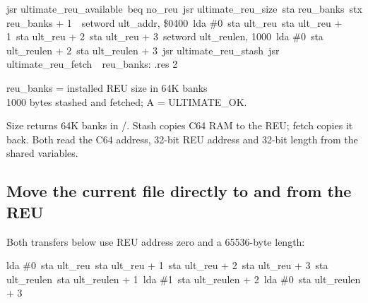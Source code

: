 \begin{listingbox}
\hspace*{2em}jsr ultimate\_reu\_available\
\hspace*{2em}beq no\_reu\
\hspace*{2em}jsr ultimate\_reu\_size\
\hspace*{2em}sta reu\_banks\
\hspace*{2em}stx reu\_banks + 1\
\
\hspace*{2em}setword ult\_addr, \$0400\
\hspace*{2em}lda \#0\
\hspace*{2em}sta ult\_reu\
\hspace*{2em}sta ult\_reu + 1\
\hspace*{2em}sta ult\_reu + 2\
\hspace*{2em}sta ult\_reu + 3\
\hspace*{2em}setword ult\_reulen, 1000\
\hspace*{2em}lda \#0\
\hspace*{2em}sta ult\_reulen + 2\
\hspace*{2em}sta ult\_reulen + 3\
\hspace*{2em}jsr ultimate\_reu\_stash\
\hspace*{2em}jsr ultimate\_reu\_fetch\
\
reu\_banks: .res 2
\end{listingbox}

\begin{resultbox}
reu_banks = installed REU size in 64K banks\\
1000 bytes stashed and fetched; A = ULTIMATE_OK.
\end{resultbox}

Size returns 64K banks in /. Stash copies C64 RAM to the REU;
fetch copies it back. Both read the C64 address, 32-bit REU address and 32-bit
length from the shared variables.

\subsection*{Move the current file directly to and from the REU}

Both transfers below use REU address zero and a 65536-byte length:

\begin{listingbox}
\hspace*{2em}lda \#0\
\hspace*{2em}sta ult\_reu\
\hspace*{2em}sta ult\_reu + 1\
\hspace*{2em}sta ult\_reu + 2\
\hspace*{2em}sta ult\_reu + 3\
\hspace*{2em}sta ult\_reulen\
\hspace*{2em}sta ult\_reulen + 1\
\hspace*{2em}lda \#1\
\hspace*{2em}sta ult\_reulen + 2\
\hspace*{2em}lda \#0\
\hspace*{2em}sta ult\_reulen + 3
\end{listingbox}

